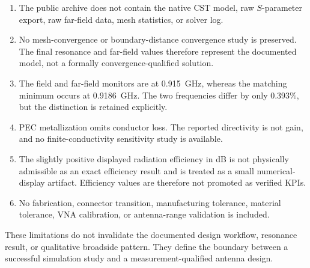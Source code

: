 \begin{enumerate}
    \item The public archive does not contain the native CST model, raw $S$-parameter
    export, raw far-field data, mesh statistics, or solver log.

    \item No mesh-convergence or boundary-distance convergence study is preserved.
    The final resonance and far-field values therefore represent the documented model,
    not a formally convergence-qualified solution.

    \item The field and far-field monitors are at 0.915~GHz, whereas the matching
    minimum occurs at 0.9186~GHz. The two frequencies differ by only 0.393\%, but the
    distinction is retained explicitly.

    \item PEC metallization omits conductor loss. The reported directivity is not gain,
    and no finite-conductivity sensitivity study is available.

    \item The slightly positive displayed radiation efficiency in dB is not physically
    admissible as an exact efficiency result and is treated as a small numerical-display
    artifact. Efficiency values are therefore not promoted as verified KPIs.

    \item No fabrication, connector transition, manufacturing tolerance, material
    tolerance, VNA calibration, or antenna-range validation is included.
\end{enumerate}

These limitations do not invalidate the documented design workflow, resonance result,
or qualitative broadside pattern. They define the boundary between a successful
simulation study and a measurement-qualified antenna design.
